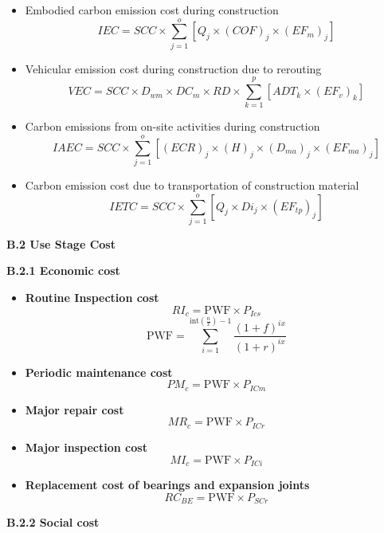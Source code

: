 \documentclass[12pt,a4paper]{article}
\begin{document}
\begin{itemize}
\item Embodied carbon emission cost during construction
\[
IEC = SCC \times \sum_{j=1}^{o} \left[ Q_{j} \times (COF)_{j} \times (EF_{m})_{j} \right]
\]

\item Vehicular emission cost during construction due to rerouting
\[
VEC = SCC \times D_{wm} \times DC_m \times RD \times \sum_{k=1}^{p} \left[ ADT_{k} \times (EF_{v})_{k} \right]
\]

\item Carbon emissions from on-site activities during construction
\[
IAEC = SCC \times \sum_{j=1}^{o} \left[ (ECR)_{j} \times (H)_{j} \times (D_{ma})_{j} \times (EF_{ma})_{j} \right]
\]

\item Carbon emission cost due to transportation of construction material
\[
IETC = SCC \times \sum_{j=1}^{o} \left[ Q_{j} \times Di_{j} \times (EF_{tp})_{j} \right]
\]
\end{itemize}

{\bfseries B.2 Use Stage Cost}

\vspace{0.3em}
\textbf{B.2.1 Economic cost}

\begin{itemize}
  \item \textbf{Routine Inspection cost}
    \[ RI_c = \mathrm{PWF} \times P_{Ics} \]
    \[
\mathrm{PWF} = \sum_{i=1}^{\mathrm{int}\left(\frac{n}{x}\right)-1} \frac{(1+f)^{i x}}{(1+r)^{i x}}
\]
  \item \textbf{Periodic maintenance cost}
    \[ PM_c = \mathrm{PWF} \times P_{ICm} \]
  \item \textbf{Major repair cost}
    \[ MR_c = \mathrm{PWF} \times P_{ICr} \]
  \item \textbf{Major inspection cost}
    \[ MI_c = \mathrm{PWF} \times P_{ICi} \]
  \item \textbf{Replacement cost of bearings and expansion joints}
    \[ RC_{BE} = \mathrm{PWF} \times P_{SCr} \]
\end{itemize}




\vspace{0.3em}
\textbf{B.2.2 Social cost}
\end{document}
